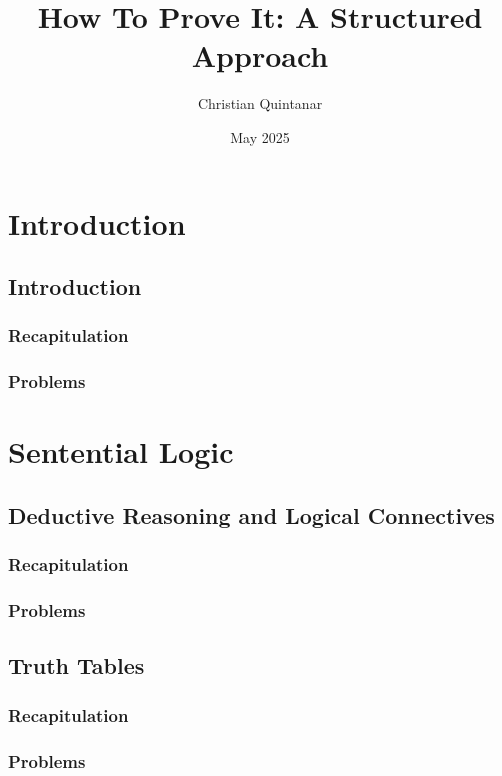 \documentclass{report}
\title{How To Prove It: A Structured Approach}
\author{Christian Quintanar}
\date{May 2025}
\begin{document}
\maketitle

\tableofcontents

\chapter{Introduction}
    \section{Introduction}
        \subsection{Recapitulation}
        
        \subsection{Problems}
        
\chapter{Sentential Logic}
    \section{Deductive Reasoning and Logical Connectives}
        \subsection{Recapitulation}
        
        \subsection{Problems}
        
    \section{Truth Tables}
        \subsection{Recapitulation}
        
        \subsection{Problems}
        
\end{document}
